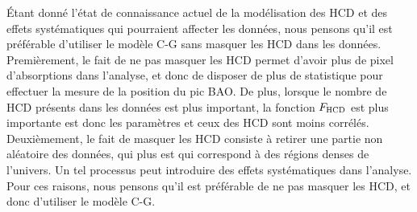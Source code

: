 Étant donné l'état de connaissance actuel de la modélisation des HCD et des effets systématiques qui pourraient affecter les données, nous pensons qu'il est préférable d'utiliser le modèle C-G sans masquer les HCD dans les données.
Premièrement, le fait de ne pas masquer les HCD permet d'avoir plus de pixel d'absorptions dans l'analyse, et donc de disposer de plus de statistique pour effectuer la mesure de la position du pic BAO.
De plus, lorsque le nombre de HCD présents dans les données est plus important, la fonction $F_{\textsc{HCD}}$ est plus importante est donc les paramètres \lya{} et ceux des HCD sont moins corrélés.
Deuxièmement, le fait de masquer les HCD consiste à retirer une partie non aléatoire des données, qui plus est qui correspond à des régions denses de l'univers.
Un tel processus peut introduire des effets systématiques dans l'analyse.
Pour ces raisons, nous pensons qu'il est préférable de ne pas masquer les HCD, et donc d'utiliser le modèle C-G.



% 
